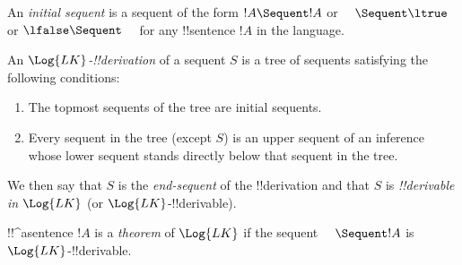\documentclass[../../../include/open-logic-section]{subfiles}
\begin{document}
\begin{defn}
An \emph{initial sequent} is a sequent of the form $!A \Sequent !A$
or $\quad \Sequent \ltrue$ or $\lfalse \Sequent \quad$ for any !!{sentence} $!A$ in the language.
\end{defn}

\begin{defn}[LK !!{derivation}]
An \emph{$\Log{LK}$-!!{derivation}} of a sequent $S$ is a tree of sequents
satisfying the following conditions:
\begin{enumerate}
\item The topmost sequents of the tree are initial sequents.
\item Every sequent in the tree (except $S$) is an upper sequent of an
  inference whose lower sequent stands directly below that sequent in
  the tree.
\end{enumerate}
We then say that $S$ is the \emph{end-sequent} of the !!{derivation} and
that $S$ is \emph{!!{derivable} in $\Log{LK}$} (or $\Log{LK}$-!!{derivable}).
\end{defn}

\begin{defn}[LK theorem]
!!^a{sentence} $!A$ is a \emph{theorem} of $\Log{LK}$ if the sequent
$\quad \Sequent !A$ is $\Log{LK}$-!!{derivable}.
\end{defn}
\end{document}
